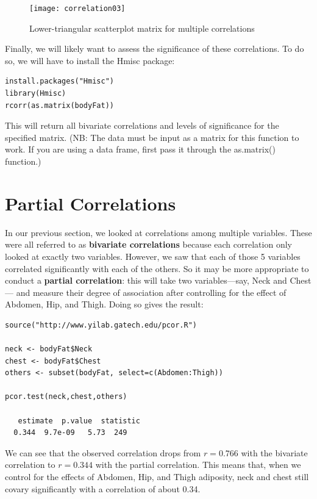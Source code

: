\begin{figure}[h]
\texttt{[image: correlation03]}
\label{fig:correlation03}
\caption{Lower-triangular scatterplot matrix for multiple correlations}
\end{figure}

Finally, we will likely want to assess the significance of these correlations. To do so, we will have to install the Hmisc package:

\begin{framed}
\begin{Verbatim}[samepage=TRUE]
install.packages("Hmisc")
library(Hmisc)
rcorr(as.matrix(bodyFat))
\end{Verbatim}
\end{framed}

This will return all bivariate correlations and levels of significance for the specified matrix. (NB: The data must be input as a matrix for this function to work. If you are using a data frame, first pass it through the as.matrix() function.)

\section{Partial Correlations}
In our previous section, we looked at correlations among multiple variables. These were all referred to as \textbf{bivariate correlations} because each correlation only looked at exactly two variables. However, we saw that each of those 5 variables correlated significantly with each of the others. So it may be more appropriate to conduct a \textbf{partial correlation}: this will take two variables---say, Neck and Chest--- and measure their degree of association after controlling for the effect of Abdomen, Hip, and Thigh. Doing so gives the result:

\begin{framed}
\begin{Verbatim}[samepage=TRUE]
source("http://www.yilab.gatech.edu/pcor.R")

neck <- bodyFat$Neck
chest <- bodyFat$Chest
others <- subset(bodyFat, select=c(Abdomen:Thigh))

pcor.test(neck,chest,others)

   estimate  p.value  statistic
  0.344  9.7e-09   5.73  249
\end{Verbatim}
\end{framed}

We can see that the observed correlation drops from \(r=0.766\) with the bivariate correlation to \(r=0.344\) with the partial correlation. This means that, when we control for the effects of Abdomen, Hip, and Thigh adiposity, neck and chest still covary significantly with a correlation of about 0.34.

